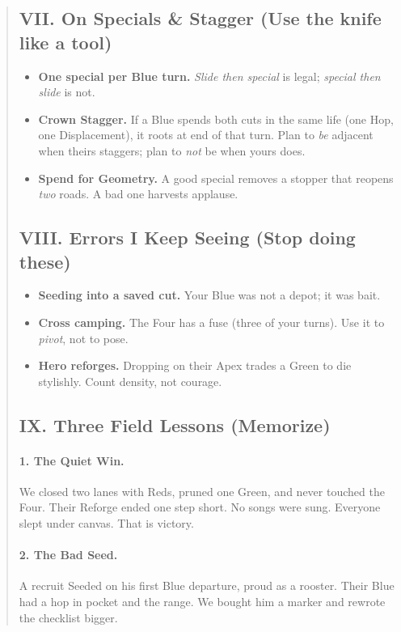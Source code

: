 \documentclass[11pt]{article}
\begin{document}
\begin{quote}
\subsection{VII. On Specials \& Stagger (Use the knife like a tool)}
\begin{itemize}\itemsep0.2em
  \item \textbf{One special per Blue turn.} \emph{Slide then special} is legal; \emph{special then slide} is not.
  \item \textbf{Crown Stagger.} If a Blue spends both cuts in the same life (one Hop, one Displacement), it roots at end of that turn. Plan to \emph{be} adjacent when theirs staggers; plan to \emph{not} be when yours does.
  \item \textbf{Spend for Geometry.} A good special removes a stopper that reopens \emph{two} roads. A bad one harvests applause.
\end{itemize}

\subsection{VIII. Errors I Keep Seeing (Stop doing these)}
\begin{itemize}\itemsep0.2em
  \item \textbf{Seeding into a saved cut.} Your Blue was not a depot; it was bait.
  \item \textbf{Cross camping.} The Four has a fuse (three of your turns). Use it to \emph{pivot}, not to pose.
  \item \textbf{Hero reforges.} Dropping on their Apex trades a Green to die stylishly. Count density, not courage.
\end{itemize}

\subsection{IX. Three Field Lessons (Memorize)}
\paragraph{1. The Quiet Win.} We closed two lanes with Reds, pruned one Green, and never touched the Four. Their Reforge ended one step short. No songs were sung. Everyone slept under canvas. That is victory.
\paragraph{2. The Bad Seed.} A recruit Seeded on his first Blue departure, proud as a rooster. Their Blue had a hop in pocket and the range. We bought him a marker and rewrote the checklist bigger.

\end{quote}
\end{document}
